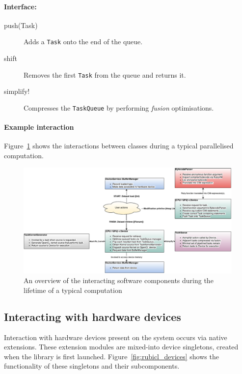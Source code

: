 \begin{description}
\paragraph*{Interface:}
\begin{description}
  \item[push(Task)] Adds a \verb|Task| onto the end of the queue.

\item[shift] Removes the first \verb|Task| from the queue and returns it.

\item[simplify!] Compresses the \verb|TaskQueue| by performing \emph{fusion} optimisations.
\end{description}


\end{description}


\paragraph*{Example interaction} Figure~\ref{fig:rubicl_components} shows the interactions between classes during a typical parallelised computation.
\begin{figure}
  \includegraphics[width=\textwidth]{./figures/arch_components.pdf}
  \caption{An overview of the interacting software components during the lifetime of a typical computation}
  \label{fig:rubicl_components}
\end{figure}

\subsection{Interacting with hardware devices}
Interaction with hardware devices present on the system occurs via native extensions. These extension modules are mixed-into device singletons, created when the library is first launched. Figure~\ref{fig:rubicl_devices} shows the functionality of these singletons and their subcomponents.

